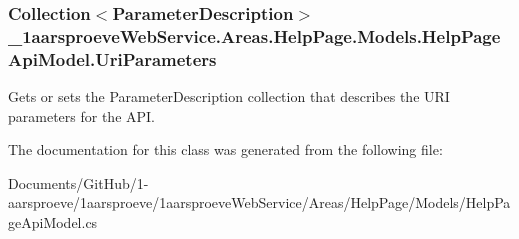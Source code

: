 \subsubsection[{Uri\+Parameters}]{\setlength{\rightskip}{0pt plus 5cm}Collection$<${\bf Parameter\+Description}$>$ \+\_\+1aarsproeve\+Web\+Service.\+Areas.\+Help\+Page.\+Models.\+Help\+Page\+Api\+Model.\+Uri\+Parameters\hspace{0.3cm}{\ttfamily [get]}}\label{class__1aarsproeve_web_service_1_1_areas_1_1_help_page_1_1_models_1_1_help_page_api_model_a13910e263edc19222bbb60615d1f80be}


Gets or sets the Parameter\+Description collection that describes the U\+R\+I parameters for the A\+P\+I. 



The documentation for this class was generated from the following file\+:\begin{DoxyCompactItemize}
\item 
Documents/\+Git\+Hub/1-\/aarsproeve/1aarsproeve/1aarsproeve\+Web\+Service/\+Areas/\+Help\+Page/\+Models/Help\+Page\+Api\+Model.\+cs\end{DoxyCompactItemize}

